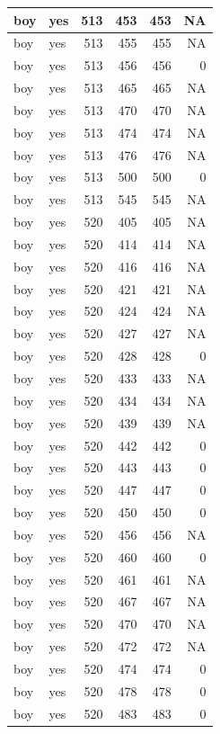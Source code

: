 \documentclass[man]{apa6}
\begin{document}
\begin{tabular}{l|l|r|r|r|r}
\hline
boy & yes & 513 & 453 & 453 & NA\\
\hline
boy & yes & 513 & 455 & 455 & NA\\
\hline
boy & yes & 513 & 456 & 456 & 0\\
\hline
boy & yes & 513 & 465 & 465 & NA\\
\hline
boy & yes & 513 & 470 & 470 & NA\\
\hline
boy & yes & 513 & 474 & 474 & NA\\
\hline
boy & yes & 513 & 476 & 476 & NA\\
\hline
boy & yes & 513 & 500 & 500 & 0\\
\hline
boy & yes & 513 & 545 & 545 & NA\\
\hline
boy & yes & 520 & 405 & 405 & NA\\
\hline
boy & yes & 520 & 414 & 414 & NA\\
\hline
boy & yes & 520 & 416 & 416 & NA\\
\hline
boy & yes & 520 & 421 & 421 & NA\\
\hline
boy & yes & 520 & 424 & 424 & NA\\
\hline
boy & yes & 520 & 427 & 427 & NA\\
\hline
boy & yes & 520 & 428 & 428 & 0\\
\hline
boy & yes & 520 & 433 & 433 & NA\\
\hline
boy & yes & 520 & 434 & 434 & NA\\
\hline
boy & yes & 520 & 439 & 439 & NA\\
\hline
boy & yes & 520 & 442 & 442 & 0\\
\hline
boy & yes & 520 & 443 & 443 & 0\\
\hline
boy & yes & 520 & 447 & 447 & 0\\
\hline
boy & yes & 520 & 450 & 450 & 0\\
\hline
boy & yes & 520 & 456 & 456 & NA\\
\hline
boy & yes & 520 & 460 & 460 & 0\\
\hline
boy & yes & 520 & 461 & 461 & NA\\
\hline
boy & yes & 520 & 467 & 467 & NA\\
\hline
boy & yes & 520 & 470 & 470 & NA\\
\hline
boy & yes & 520 & 472 & 472 & NA\\
\hline
boy & yes & 520 & 474 & 474 & 0\\
\hline
boy & yes & 520 & 478 & 478 & 0\\
\hline
boy & yes & 520 & 483 & 483 & 0\\

\end{tabular}
\end{document}
